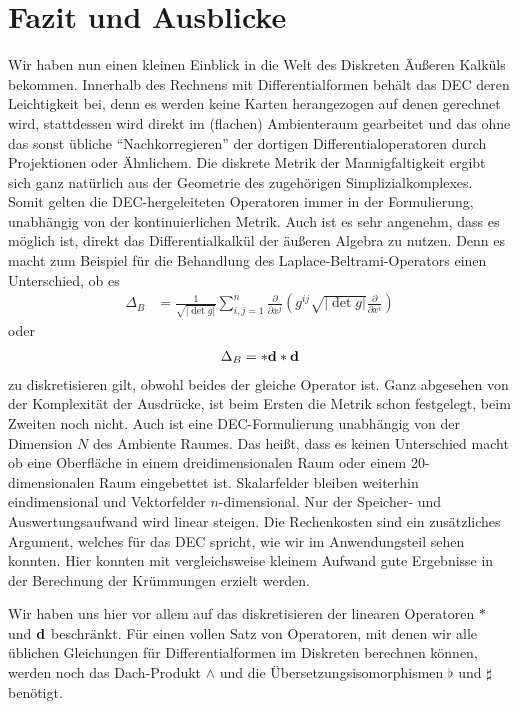 \chapter{Fazit und Ausblicke}

Wir haben nun einen kleinen Einblick in die Welt des Diskreten Äußeren Kalküls bekommen.
Innerhalb des Rechnens mit Differentialformen behält das DEC deren Leichtigkeit bei,
denn es werden keine Karten herangezogen auf denen gerechnet wird, stattdessen wird direkt im (flachen) Ambienteraum gearbeitet und das ohne
das sonst übliche "`Nachkorregieren"' der dortigen Differentialoperatoren durch Projektionen oder Ähnlichem.
Die diskrete Metrik der Mannigfaltigkeit ergibt sich ganz natürlich aus der Geometrie des zugehörigen Simplizialkomplexes.
Somit gelten die DEC-hergeleiteten Operatoren immer in der Formulierung, unabhängig von der kontinuierlichen Metrik.
Auch ist es sehr angenehm, dass es möglich ist, direkt das Differentialkalkül der äußeren Algebra zu nutzen. 
Denn es macht zum Beispiel für die Behandlung des
Laplace-Beltrami-Operators einen Unterschied, ob es 
    \begin{align}
      \Delta_{B} &= \frac{1}{\sqrt{\left| \det g \right|}} \sum_{i,j=1}^{n} \frac{\partial}{\partial x^{j}} \left( g^{ij}\sqrt{\left| \det g \right|} \frac{\partial }{\partial x^{i}}
      \right)
    \end{align}
oder
  \begin{align}
    \Delta_{B} = *\mathbf{d} *\mathbf{d}
  \end{align}
zu diskretisieren gilt, obwohl beides der gleiche Operator ist.
Ganz abgesehen von der Komplexität der Ausdrücke, ist beim Ersten die Metrik schon festgelegt, beim Zweiten noch nicht.
Auch ist eine DEC-Formulierung unabhängig von der Dimension \( N \) des Ambiente Raumes. 
Das heißt, dass es keinen Unterschied macht ob eine
Oberfläche in einem dreidimensionalen Raum oder einem 20-dimensionalen Raum eingebettet ist.
Skalarfelder bleiben weiterhin eindimensional und Vektorfelder \( n \)-dimensional.
Nur der Speicher- und Auswertungsaufwand wird linear steigen.
Die Rechenkosten sind ein zusätzliches Argument, welches für das DEC spricht, wie wir im Anwendungsteil sehen konnten.
Hier konnten mit vergleichsweise kleinem Aufwand gute Ergebnisse in der Berechnung der Krümmungen erzielt werden.

Wir haben uns hier vor allem auf das diskretisieren der linearen Operatoren \( * \) und \( \mathbf{d} \) beschränkt.
Für einen vollen Satz von Operatoren, mit denen wir alle üblichen Gleichungen für Differentialformen im Diskreten berechnen können, werden noch
das Dach-Produkt \( \wedge  \) und die Übersetzungsisomorphismen \( \flat \) und \( \sharp \) benötigt.

